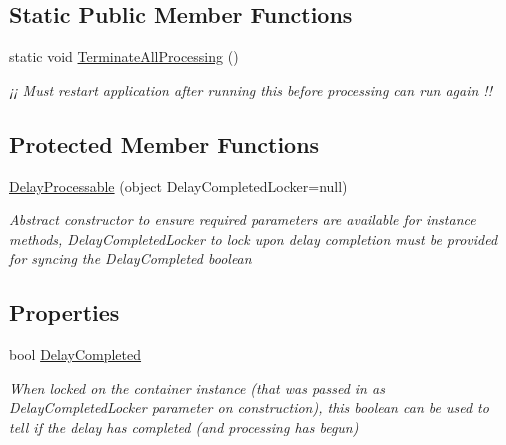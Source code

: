 \subsection*{Static Public Member Functions}
\begin{DoxyCompactItemize}
\item 
static void \hyperlink{class_cloud_api_public_1_1_support_1_1_delay_processable_3_01_t_01_4_ad4206ec8a7a5ccf95eb505e1351e1bee}{Terminate\-All\-Processing} ()
\begin{DoxyCompactList}\small\item\em ¡¡ Must restart application after running this before processing can run again !! \end{DoxyCompactList}\end{DoxyCompactItemize}
\subsection*{Protected Member Functions}
\begin{DoxyCompactItemize}
\item 
\hyperlink{class_cloud_api_public_1_1_support_1_1_delay_processable_3_01_t_01_4_a6152750dbaa593d7be67346effeabc8f}{Delay\-Processable} (object Delay\-Completed\-Locker=null)
\begin{DoxyCompactList}\small\item\em Abstract constructor to ensure required parameters are available for instance methods, Delay\-Completed\-Locker to lock upon delay completion must be provided for syncing the Delay\-Completed boolean \end{DoxyCompactList}\end{DoxyCompactItemize}
\subsection*{Properties}
\begin{DoxyCompactItemize}
\item 
bool \hyperlink{class_cloud_api_public_1_1_support_1_1_delay_processable_3_01_t_01_4_a9605535bcda38d09fc9aece45f7b4003}{Delay\-Completed}
\begin{DoxyCompactList}\small\item\em When locked on the container instance (that was passed in as Delay\-Completed\-Locker parameter on construction), this boolean can be used to tell if the delay has completed (and processing has begun) \end{DoxyCompactList}\end{DoxyCompactItemize}


